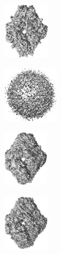 \begin{figure}[t]
    \vspace{1em}
    \begin{subfigure}[b]{0.15\linewidth}
        \centering
        \includegraphics[height=2.4cm]{figures/5a1a_quartercov_uniformS2_noise0_gt_.png}
        \caption{}\label{fig:5a1a-noise0-reconstruction-true}
    \end{subfigure}
    \hfill
    \begin{subfigure}[b]{0.15\linewidth}
        \centering
        \includegraphics[height=2.4cm]{figures/5a1a_quartercov_uniformS2_noise0_rand.png}
        \caption{}
    \end{subfigure}
    \hfill
    \begin{subfigure}[b]{0.15\linewidth}
        \centering
        \includegraphics[height=2.4cm]{figures/5a1a_quartercov_uniformS2_noise0_apr_.png}
        \caption{}\label{fig:5a1a-noise0-reconstruction-recovered}
    \end{subfigure}
    \hfill
    \begin{subfigure}[b]{0.15\linewidth}
        \centering
        \includegraphics[height=2.4cm]{figures/5a1a_quartercov_uniformS2_noise16_apr_.png}
        \caption{}\label{fig:5a1a-noise16-reconstruction-recovered}
    \end{subfigure}
    \hfill
    \begin{subfigure}[b]{0.33\linewidth}

\end{subfigure}
\end{figure}
